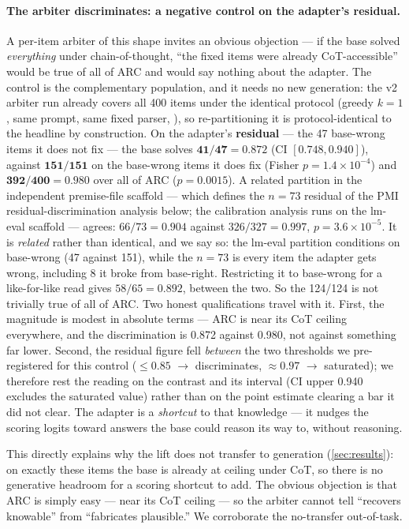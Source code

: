 \paragraph{The arbiter discriminates: a negative control on the adapter's
residual.}
A per-item arbiter of this shape invites an obvious objection --- if the base
solved \emph{everything} under chain-of-thought, ``the fixed items were already
CoT-accessible'' would be true of all of ARC and would say nothing about the
adapter. The control is the complementary population, and it needs no new
generation: the v2 arbiter run already covers all 400 items under the identical
protocol (greedy $k{=}1$, same prompt, same fixed parser, ), so
re-partitioning it is protocol-identical to the headline by construction. On the
adapter's \textbf{residual} --- the 47 base-wrong items it does not fix --- the base
solves $\mathbf{41/47 = 0.872}$ (CI $[0.748, 0.940]$), against $\mathbf{151/151}$ on
the base-wrong items it does fix (Fisher $p=1.4\times10^{-4}$) and
$\mathbf{392/400 = 0.980}$ over all of ARC ($p=0.0015$). A related partition in the
independent premise-file scaffold --- which defines the $n{=}73$ residual of the PMI
residual-discrimination analysis below; the calibration analysis runs on the lm-eval
scaffold --- agrees: $66/73 = 0.904$ against $326/327 = 0.997$,
$p=3.6\times10^{-5}$. It is \emph{related} rather than identical, and we say so: the
lm-eval partition conditions on base-wrong (47 against 151), while the $n{=}73$ is
every item the adapter gets wrong, including 8 it broke from base-right. Restricting
it to base-wrong for a like-for-like read gives $58/65 = 0.892$, between the two. So
the 124/124 is not trivially true of all of ARC. Two honest qualifications travel
with it. First, the magnitude is modest in absolute terms --- ARC is near its CoT
ceiling everywhere, and the discrimination is 0.872 against 0.980, not against
something far lower. Second, the residual figure fell \emph{between} the two
thresholds we pre-registered for this control (${\leq}0.85$ $\rightarrow$
discriminates, ${\approx}0.97$ $\rightarrow$ saturated); we therefore rest the
reading on the contrast and its interval (CI upper 0.940 excludes the saturated
value) rather than on the point estimate clearing a bar it did not clear. The
adapter is a \emph{shortcut} to that knowledge --- it nudges the scoring logits
toward answers the base could reason its way to, without reasoning.

This directly explains why the lift does not transfer to generation
(\cref{sec:results}): on exactly these items the base is already at ceiling under
CoT, so there is no generative headroom for a scoring shortcut to add. The obvious
objection is that ARC is simply easy --- near its CoT ceiling --- so the arbiter
cannot tell ``recovers knowable'' from ``fabricates plausible.'' We corroborate the
no-transfer out-of-task.

